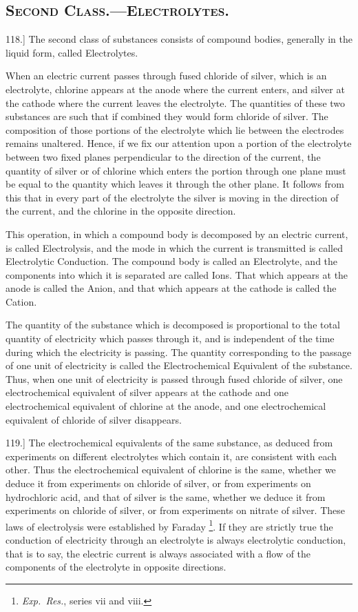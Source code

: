 \documentclass[12pt,oneside]{book}[2021/10/04]
\let\oldfootnote\footnote
\renewcommand\footnote[1]{%
\oldfootnote{\hspace{0.14em}#1}}
\newcommand{\Heading}{\centering\normalfont}
\newcommand{\Section}[1]{\subsection*{\normalsize\Heading\scshape #1}}
\newcommand{\Runhead}[1]{\fancyhead[C]{\iffloatpage{}{\small#1}}}
\newcommand{\article}[1]{\phantomsection \label{art:#1}{#1.]}}
\newcommand{\¬}{\hphantom{0}}
\begin{document}
\Section{Second Class.---Electrolytes.}

\article{118} The second class of substances consists of compound bodies,
generally in the liquid form, called Electrolytes.

When an electric current passes through fused chloride of silver,
which is an electrolyte, chlorine appears at the anode where the
current enters, and silver at the cathode where the current leaves
the electrolyte. The quantities of these two substances are such
that if combined they would form chloride of silver. The composition
of those portions of the electrolyte which lie between the
electrodes remains unaltered. Hence, if we fix our attention upon
a portion of the electrolyte between two fixed planes perpendicular
to the direction of the current, the quantity of silver or of chlorine
which enters the portion through one plane must be equal to the
quantity which leaves it through the other plane. It follows from
this that in every part of the electrolyte the silver is moving in the
direction of the current, and the chlorine in the opposite direction.

This operation, in which a compound body is decomposed by an
electric current, is called Electrolysis, and the mode in which the
current is transmitted is called Electrolytic Conduction. The
compound body is called an Electrolyte, and the components into
which it is separated are called Ions. That which appears at the
anode is called the Anion, and that which appears at the cathode is
called the Cation.

\label{art:118a}
The quantity of the substance which is decomposed is proportional
to the total quantity of electricity which passes through it,
and is independent of the time during which the electricity is
passing. The quantity corresponding to the passage of one unit
of electricity is called the Electrochemical Equivalent of the substance.
Thus, when one unit of electricity is passed through fused
chloride of silver, one electrochemical equivalent of silver appears
at the cathode and one electrochemical equivalent of chlorine at
the anode, and one electrochemical equivalent of chloride of silver
disappears.

\article{119} The electrochemical equivalents of the same substance, as
deduced from experiments on different electrolytes which contain
it, are consistent with each other. Thus the electrochemical
equivalent of chlorine is the same, whether we deduce it from
experiments on chloride of silver, or from experiments on hydrochloric
acid, and that of silver is the same, whether we deduce
it from experiments on chloride of silver, or from experiments on
nitrate of silver. These laws of electrolysis were established by
Faraday\footnote{\textit{Exp.\ Res.}, series vii and viii.}.
If they are strictly true the conduction of electricity
through an electrolyte is always electrolytic conduction, that is to
say, the electric current is always associated with a flow of the
components of the electrolyte in opposite directions.
\Runhead{FARADAY'S LAWS OF ELECTROLYSIS.}
\end{document}

